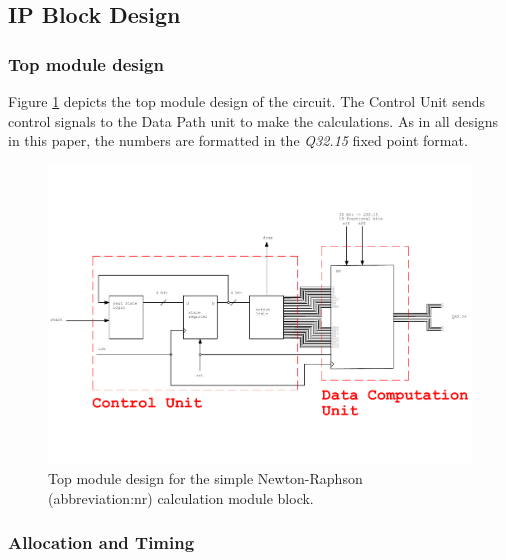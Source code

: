 \documentclass[a4paper, twoside, 11pt]{article}
\newcommand{\fbar}{\FloatBarrier}
\begin{document}
    \subsection{IP Block Design}
        
        \fbar
        \subsubsection{Top module design}
            Figure \ref{fig:simple-nr-top-module} depicts the top module design of the circuit. The Control Unit sends control signals to the Data Path unit to make the calculations. As in all designs in this paper, the numbers are formatted in the \textit{Q32.15} fixed point format.
            \begin{figure}[htbp!]
                \centering
                \includegraphics[width=1\textwidth]{src/pdf/simple-nr-top-module.pdf}
                \caption{Top module design for the simple Newton-Raphson (\gls{abbreviation:nr}) calculation module block.}
                \label{fig:simple-nr-top-module}
            \end{figure}

        \fbar
        \subsubsection{Allocation and Timing}
            
\end{document}
